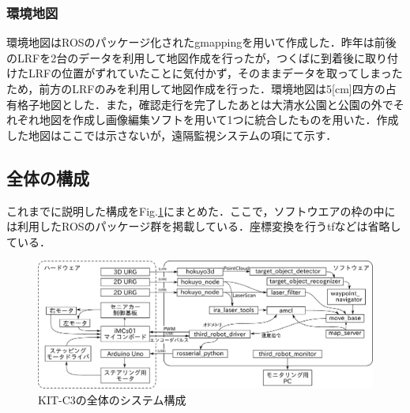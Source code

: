 \documentclass[10pt,a4paper]{jarticle}
\begin{document}
\subsubsection{環境地図}
環境地図はROSのパッケージ化されたgmappingを用いて作成した．昨年は前後のLRFを2台のデータを利用して地図作成を行ったが，つくばに到着後に取り付けたLRFの位置がずれていたことに気付かず，そのままデータを取ってしまったため，前方のLRFのみを利用して地図作成を行った．環境地図は5[cm]四方の占有格子地図とした．また，確認走行を完了したあとは大清水公園と公園の外でそれぞれ地図を作成し画像編集ソフトを用いて1つに統合したものを用いた．作成した地図はここでは示さないが，遠隔監視システムの項にて示す．

\subsection{全体の構成}
これまでに説明した構成をFig.\ref{184559_7Dec16}にまとめた．ここで，ソフトウエアの枠の中には利用したROSのパッケージ群を掲載している．座標変換を行うtfなどは省略している．
\begin{figure}[ht]
 \centering
 \includegraphics[width=16cm]{./fig/eps/whole_system.eps}
 \caption{KIT-C3の全体のシステム構成}
 \label{184559_7Dec16}
\end{figure}
\end{document}
